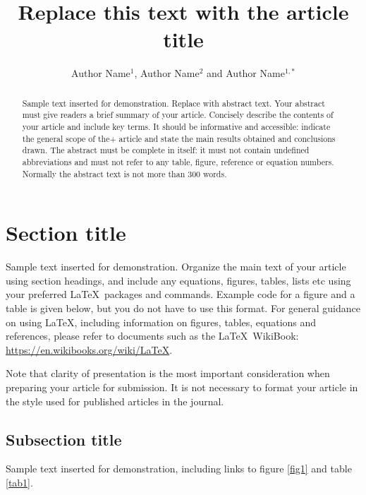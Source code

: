 \documentclass{iopjournal}
\begin{document}

\title{Replace this text with the article title}

\author{Author Name$^1$, Author Name$^2$ and Author Name$^{1,*}$}






\begin{abstract}
Sample text inserted for demonstration. Replace with abstract text. Your abstract must give readers a brief summary of your article. Concisely describe the contents of your article and include key terms. It should be informative and accessible: indicate the general scope of the+ article and state the main results obtained and conclusions drawn. The abstract must be complete in itself: it must not contain undefined abbreviations and must not refer to any table, figure, reference or equation numbers. Normally the abstract text is not more than 300 words.
\end{abstract}

\section{Section title}
Sample text inserted for demonstration. Organize the main text of your article using section headings, and include any equations, figures, tables, lists etc using your preferred \LaTeX\ packages and commands. Example code for a figure and a table is given below, but you do not have to use this format. For general guidance on using \LaTeX , including information on figures, tables, equations and references, please refer to documents such as the \LaTeX\ WikiBook: \href{https://en.wikibooks.org/wiki/LaTeX}{https://en.wikibooks.org/wiki/LaTeX}.

Note that clarity of presentation is the most important consideration when preparing your article for submission. It is not necessary to format your article in the style used for published articles in the journal.

\subsection{Subsection title}
Sample text inserted for demonstration, including links to figure \ref{fig1} and table \ref{tab1}.
\end{document}
